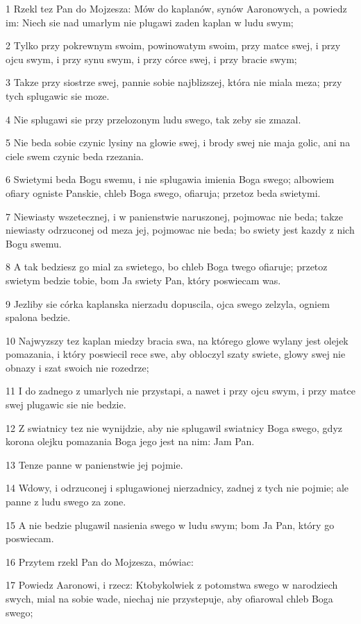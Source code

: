\par 1 Rzekl tez Pan do Mojzesza: Mów do kaplanów, synów Aaronowych, a powiedz im: Niech sie nad umarlym nie plugawi zaden kaplan w ludu swym;
\par 2 Tylko przy pokrewnym swoim, powinowatym swoim, przy matce swej, i przy ojcu swym, i przy synu swym, i przy córce swej, i przy bracie swym;
\par 3 Takze przy siostrze swej, pannie sobie najblizszej, która nie miala meza; przy tych splugawic sie moze.
\par 4 Nie splugawi sie przy przelozonym ludu swego, tak zeby sie zmazal.
\par 5 Nie beda sobie czynic lysiny na glowie swej, i brody swej nie maja golic, ani na ciele swem czynic beda rzezania.
\par 6 Swietymi beda Bogu swemu, i nie splugawia imienia Boga swego; albowiem ofiary ogniste Panskie, chleb Boga swego, ofiaruja; przetoz beda swietymi.
\par 7 Niewiasty wszetecznej, i w panienstwie naruszonej, pojmowac nie beda; takze niewiasty odrzuconej od meza jej, pojmowac nie beda; bo swiety jest kazdy z nich Bogu swemu.
\par 8 A tak bedziesz go mial za swietego, bo chleb Boga twego ofiaruje; przetoz swietym bedzie tobie, bom Ja swiety Pan, który poswiecam was.
\par 9 Jezliby sie córka kaplanska nierzadu dopuscila, ojca swego zelzyla, ogniem spalona bedzie.
\par 10 Najwyzszy tez kaplan miedzy bracia swa, na którego glowe wylany jest olejek pomazania, i który poswiecil rece swe, aby obloczyl szaty swiete, glowy swej nie obnazy i szat swoich nie rozedrze;
\par 11 I do zadnego z umarlych nie przystapi, a nawet i przy ojcu swym, i przy matce swej plugawic sie nie bedzie.
\par 12 Z swiatnicy tez nie wynijdzie, aby nie splugawil swiatnicy Boga swego, gdyz korona olejku pomazania Boga jego jest na nim: Jam Pan.
\par 13 Tenze panne w panienstwie jej pojmie.
\par 14 Wdowy, i odrzuconej i splugawionej nierzadnicy, zadnej z tych nie pojmie; ale panne z ludu swego za zone.
\par 15 A nie bedzie plugawil nasienia swego w ludu swym; bom Ja Pan, który go poswiecam.
\par 16 Przytem rzekl Pan do Mojzesza, mówiac:
\par 17 Powiedz Aaronowi, i rzecz: Ktobykolwiek z potomstwa swego w narodziech swych, mial na sobie wade, niechaj nie przystepuje, aby ofiarowal chleb Boga swego;
